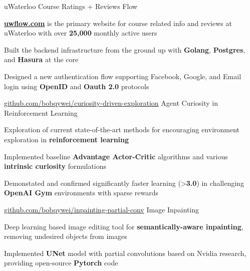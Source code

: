 
\begin{cventries}
  \cventry
    {uWaterloo Course Ratings + Reviews} %
    {Flow} %
    {} %
    {} %
    {
      \begin{cvitems} %
        \item {\href{https://uwflow.com}{\textbf{uwflow.com}} is the primary website for course related info and reviews at uWaterloo with over \textbf{25,000} monthly active users}
        \item {Built the backend infrastructure from the ground up with \textbf{Golang}, \textbf{Postgres}, and \textbf{Hasura} at the core}
        \item {Designed a new authentication flow supporting Facebook, Google, and Email login using \textbf{OpenID} and \textbf{Oauth 2.0} protocols}
      \end{cvitems}
    }

  \cventry
    {\href{https://github.com/bobqywei/curiosity-driven-exploration}{github.com/bobqywei/curiosity-driven-exploration}} %
    {Agent Curiosity in Reinforcement Learning} %
    {} %
    {} %
    {
      \begin{cvitems} %
      	\item {Exploration of current state-of-the-art methods for encouraging environment exploration in \textbf{reinforcement learning}}
      	\item {Implemented baseline \textbf{Advantage Actor-Critic} algorithms and various \textbf{intrinsic curiosity} formulations}
      	\item {Demonstated and confirmed significantly faster learning (>\textbf{3.0\times}) in challenging \textbf{OpenAI Gym} environments with sparse rewards}
      \end{cvitems}
    }

  \cventry
    {\href{https://github.com/bobqywei/inpainting-partial-conv}{github.com/bobqywei/inpainting-partial-conv}} %
    {Image Inpainting} %
    {} %
    {} %
    {
      \begin{cvitems} %
        \item {Deep learning based image editing tool for \textbf{semantically-aware inpainting}, removing undesired objects from images}
        \item {Implemented \textbf{UNet} model with partial convolutions based on Nvidia research, providing open-source \textbf{Pytorch} code}
      \end{cvitems}
    }
\end{cventries}